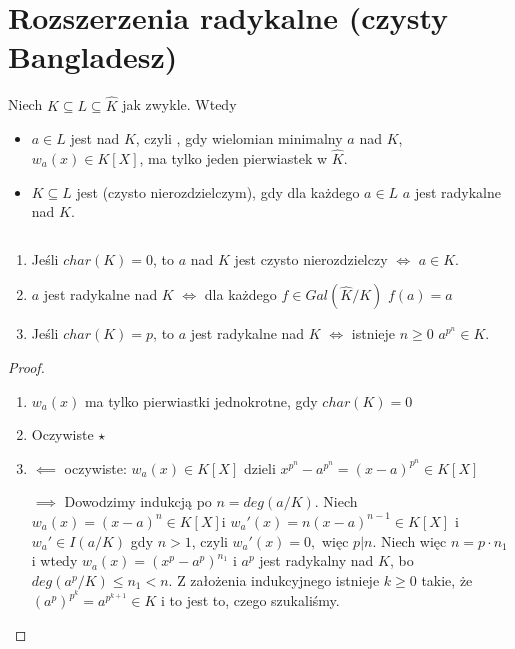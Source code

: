 \section{Rozszerzenia radykalne (czysty Bangladesz)}

\begin{bbox}
    Niech $K\subseteq L\subseteq \hat{K}$ jak zwykle. Wtedy
    \begin{itemize}
        \item[\PHtunny] $a\in L$ jest  nad $K$, czyli , gdy wielomian minimalny $a$ nad $K$, $w_a(x)\in K[X]$, ma tylko jeden pierwiastek w $\hat{K}$.
        \item[\PHtunny] $K\subseteq L$ jest  (czysto nierozdzielczym), gdy dla każdego $a\in L$ $a$ jest radykalne nad $K$.
    \end{itemize}
\end{bbox}

\begin{remark}
    $ $\newline
    \begin{enumerate}
    \item Jeśli $char(K)=0$, to $a$ nad $K$ jest czysto nierozdzielczy $\iff$ $a\in K$.
    \item $a$ jest radykalne nad $K$ $\iff$ dla każdego $f\in Gal(\hat{K}/K)$ $f(a)=a$
    \item Jeśli $char(K)=p$, to $a$ jest radykalne nad $K$ $\iff$ istnieje $n\geq 0$ $a^{p^n}\in K$.
    \end{enumerate}
\end{remark}
\begin{proof}
$ $\newline
\begin{enumerate}[leftmargin=*]
    \item $w_a(x)$ ma tylko pierwiastki jednokrotne, gdy $char(K)=0$
    \item Oczywiste $\star$
    \item $\impliedby$ oczywiste: $w_a(x)\in K[X]$ dzieli $x^{p^n}-a^{p^n}=(x-a)^{p^n}\in K[X]$

    $\implies$ Dowodzimy indukcją po $n=deg(a/K)$. Niech $w_a(x)=(x-a)^n\in K[X]$i $w_a'(x)=n(x-a)^{n-1}\in K[X]$ i $w_a'\in I(a/K)$ gdy $n>1$, czyli $w_a'(x)=0,$ więc $p|n$. Niech więc $n=p\cdot n_1$ i wtedy $w_a(x)=(x^p-a^p)^{n_1}$ i $a^p$ jest radykalny nad $K$, bo $deg(a^p/K)\leq n_1<n$. Z założenia indukcyjnego istnieje $k\geq 0$ takie, że $(a^p)^{p^k}=a^{p^{k+1}}\in K$ i to jest to, czego szukaliśmy. 
\end{enumerate}
\end{proof}









